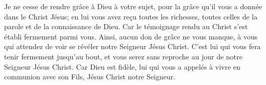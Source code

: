 Je ne cesse de rendre grâce à Dieu à votre sujet,
	pour la grâce qu’il vous a donnée dans le Christ Jésus;
	en lui vous avez reçu toutes les richesses,
	toutes celles de la parole et de la connaissance de Dieu.
Car le témoignage rendu au Christ s’est établi fermement parmi vous.
Ainsi, aucun don de grâce ne vous manque,
	à vous qui attendez de voir se révéler notre Seigneur Jésus Christ.
C’est lui qui vous fera tenir fermement jusqu’au bout,
	et vous serez sans reproche au jour de notre Seigneur Jésus Christ.
Car Dieu est fidèle, lui qui vous a appelés à vivre en communion avec son Fils,
		Jésus Christ notre Seigneur.
